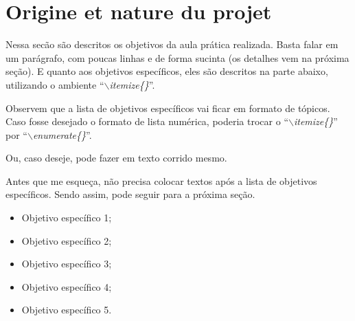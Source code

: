 \chapter{Origine et nature du projet}\label{chapter:origine}

Nessa secão são descritos os objetivos da aula prática realizada. Basta falar em um parágrafo, com poucas linhas e de forma sucinta (os detalhes vem na próxima seção). E quanto aos objetivos específicos, eles são descritos na parte abaixo, utilizando o ambiente ``\textit{$\backslash$itemize\{\}}''.

Observem que a lista de objetivos específicos vai ficar em formato de tópicos. Caso fosse desejado o formato de lista numérica, poderia trocar o ``\textit{$\backslash$itemize\{\}}'' por ``\textit{$\backslash$enumerate\{\}}''.

Ou, caso deseje, pode fazer em texto corrido mesmo.

Antes que me esqueça, não precisa colocar textos após a lista de objetivos específicos. Sendo assim, pode seguir para a próxima seção.

\begin{itemize}
    \item Objetivo específico 1;
    \item Objetivo específico 2;
    \item Objetivo específico 3;
    \item Objetivo específico 4;
    \item Objetivo específico 5.
\end{itemize}

\noindent\par

